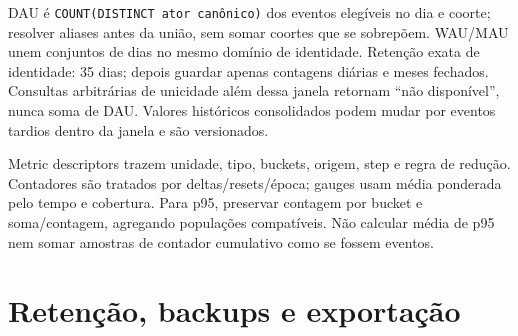 \documentclass[10pt,a4paper]{article}
\begin{document}
DAU é {\footnotesize\ttfamily\nolinkurl{COUNT(DISTINCT}\ \nolinkurl{ator}\ \nolinkurl{canônico)}} dos eventos elegíveis no
dia e coorte; resolver aliases antes da união, sem somar coortes que se
sobrepõem. WAU/MAU unem conjuntos de dias no mesmo domínio de
identidade. Retenção exata de identidade: 35 dias; depois guardar apenas
contagens diárias e meses fechados. Consultas arbitrárias de unicidade
além dessa janela retornam ``não disponível'', nunca soma de DAU.
Valores históricos consolidados podem mudar por eventos tardios dentro
da janela e são versionados.

Metric descriptors trazem unidade, tipo, buckets, origem, step e regra
de redução. Contadores são tratados por deltas/resets/época; gauges usam
média ponderada pelo tempo e cobertura. Para p95, preservar contagem por
bucket e soma/contagem, agregando populações compatíveis. Não calcular
média de p95 nem somar amostras de contador cumulativo como se fossem
eventos.

\clearpage
\section{Retenção, backups e
exportação}\label{retenuxe7uxe3o-backups-e-exportauxe7uxe3o}
\end{document}
